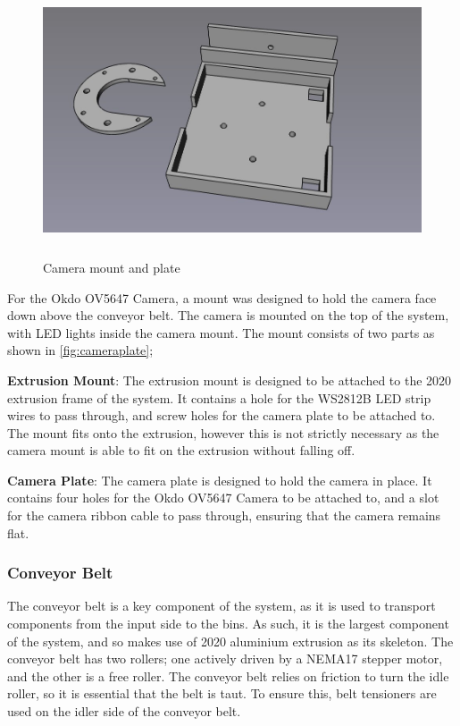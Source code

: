 \begin{figure}[H]
    \begin{minipage}[h]{0.95\textwidth}
        \centering
        \includegraphics[height=8cm]{imgs/freecad/cameraplate.jpg}
        \caption{Camera mount and plate}
        \label{fig:cameraplate}
    \end{minipage}
\end{figure}

For the Okdo OV5647 Camera, a mount was designed to hold the camera face down above the conveyor belt. The camera is mounted on the top of the system, with LED lights inside the camera mount. The mount consists of two parts as shown in \autoref{fig:cameraplate};
\begin{mylist}
    \item \textbf{Extrusion Mount}: The extrusion mount is designed to be attached to the 2020 extrusion frame of the system. It contains a hole for the WS2812B LED strip wires to pass through, and screw holes for the camera plate to be attached to. The mount fits onto the extrusion, however this is not strictly necessary as the camera mount is able to fit on the extrusion without falling off.
    \item \textbf{Camera Plate}: The camera plate is designed to hold the camera in place. It contains four holes for the Okdo OV5647 Camera to be attached to, and a slot for the camera ribbon cable to pass through, ensuring that the camera remains flat.
\end{mylist}
\subsubsection{Conveyor Belt}
\label{sec:conveyor-belt}
The conveyor belt is a key component of the system, as it is used to transport components from the input side to the bins. As such, it is the largest component of the system, and so makes use of 2020 aluminium extrusion as its skeleton. The conveyor belt has two rollers; one actively driven by a NEMA17 stepper motor, and the other is a free roller. The conveyor belt relies on friction to turn the idle roller, so it is essential that the belt is taut. To ensure this, belt tensioners are used on the idler side of the conveyor belt.

